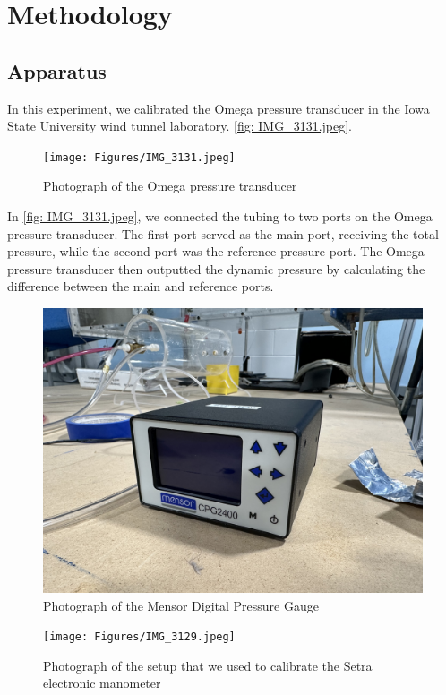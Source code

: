 \chapter{Methodology}
\label{cp:methodology}

\section{Apparatus}\label{sec:apparatus}

In this experiment, we calibrated the Omega pressure transducer in the Iowa State University wind tunnel laboratory. \autoref{fig: IMG_3131.jpeg}.

\begin{figure}[htpb]
    \centering
    \texttt{[image: Figures/IMG\_3131.jpeg]}
    \caption[Photograph of the Omega pressure transducer]{Photograph of the Omega pressure transducer}
    \label{fig: IMG_3131.jpeg}
\end{figure}

In \autoref{fig: IMG_3131.jpeg}, we connected the tubing to two ports on the Omega pressure transducer. The first port served as the main port, receiving the total pressure, while the second port was the reference pressure port. The Omega pressure transducer then outputted the dynamic pressure by calculating the difference between the main and reference ports.

\begin{figure}[htpb]
    \centering
    \includegraphics[width=0.75\linewidth]{Figures/IMG_3130.jpeg}
    \caption[Photograph of the Mensor Digital Pressure Gauge]{Photograph of the Mensor Digital Pressure Gauge}
    \label{fig: IMG_3130.jpeg}
\end{figure}

\begin{figure}[htpb]
    \centering
    \texttt{[image: Figures/IMG\_3129.jpeg]}
    \caption[Photograph of the setup that we used to calibrate the Setra electronic manometer]{Photograph of the setup that we used to calibrate the Setra electronic manometer}
    \label{fig: IMG_3129.jpeg}
\end{figure}

